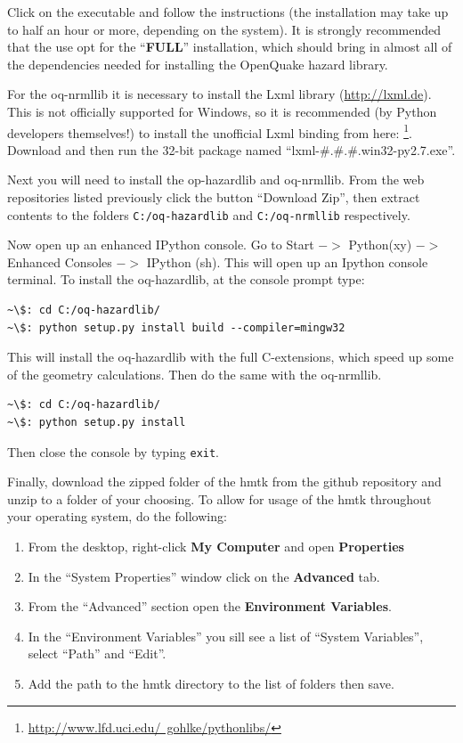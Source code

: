 Click on the executable and follow the instructions (the installation may take up to half an hour or more, depending on the system). It is strongly recommended that the use opt for the ``\textbf{FULL}'' installation, which should bring in almost all of the dependencies needed for installing the OpenQuake hazard library. 

For the oq-nrmllib it is necessary to install the Lxml library (\href{http://lxml.de}{http://lxml.de}). This is not officially supported for Windows, so it is recommended (by Python developers themselves!) to install the unofficial Lxml binding from here: \footnote{\href{http://www.lfd.uci.edu/~gohlke/pythonlibs/}{http://www.lfd.uci.edu/~gohlke/pythonlibs/}}. Download and then run the 32-bit package named ``lxml-\#.\#.\#.win32-py2.7.exe''.

Next you will need to install the op-hazardlib and oq-nrmllib. From the web repositories listed previously click the button ``Download Zip'', then extract contents to the folders \verb=C:/oq-hazardlib= and \verb=C:/oq-nrmllib= respectively.

Now open up an enhanced IPython console. Go to Start $->$ Python(xy) $->$ Enhanced Consoles $->$ IPython (sh). This will open up an Ipython console terminal. To install the oq-hazardlib, at the console prompt type:

\begin{Verbatim}[frame=single, commandchars=\\\{\}, fontsize=\scriptsize]
~\$: cd C:/oq-hazardlib/
~\$: python setup.py install build --compiler=mingw32
\end{Verbatim}

This will install the oq-hazardlib with the full C-extensions, which speed up some of the geometry calculations. Then do the same with the oq-nrmllib.

\begin{Verbatim}[frame=single, commandchars=\\\{\}, fontsize=\scriptsize]
~\$: cd C:/oq-hazardlib/
~\$: python setup.py install
\end{Verbatim}

Then close the console by typing \verb=exit=. 

Finally, download the zipped folder of the hmtk from the github repository and unzip to a folder of your choosing. To allow for usage of the hmtk throughout your operating system, do the following: 

\begin{enumerate}
\item From the desktop, right-click \textbf{My Computer} and open \textbf{Properties}
\item In the ``System Properties'' window click on the \textbf{Advanced} tab.
\item From the ``Advanced'' section open the \textbf{Environment Variables}.
\item In the ``Environment Variables'' you sill see a list of ``System Variables'', select ``Path'' and ``Edit''.
\item Add the path to the hmtk directory to the list of folders then save.
\end{enumerate}

